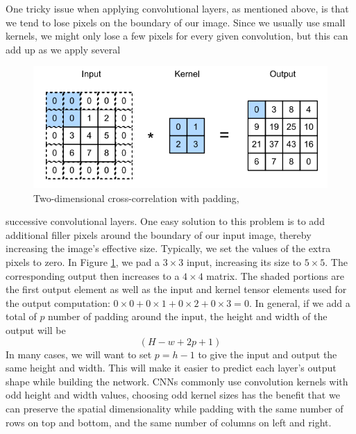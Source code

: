 \documentclass[12pt]{report}
\numberwithin{equation}{section}
\DeclarePairedDelimiter\ceil{\lceil}{\rceil}
\DeclarePairedDelimiter\floor{\lfloor}{\rfloor}
\begin{document}
One tricky issue when applying convolutional layers, as mentioned above, is that we tend to lose pixels on the boundary of our image. Since we usually use small kernels, we might only lose a few pixels for every given convolution, but this can add up as we apply several 
\begin{figure}[H]
\centering
\includegraphics[scale=0.9]{png/padding.png}
\caption[Two-dimensional cross-correlation with padding]{Two-dimensional cross-correlation with padding, \textbf{\cite{zhang2020dive}}}
\label{fig:pad}
\end{figure} \noindent
successive convolutional layers. One easy solution to this problem is to add additional filler pixels around the boundary of our input image, thereby increasing the image's effective size. Typically, we set the values of the extra pixels to zero. In Figure \ref{fig:pad}, we pad a $3 \times 3$ input, increasing its size to $5 \times 5$. The corresponding output then increases to a $4 \times 4$ matrix. The shaded portions are the first output element as well as the input and kernel tensor elements used for the output computation: $0 \times 0 + 0 \times 1 + 0 \times 2 + 0 \times 3 = 0$. In general, if we add a total of $p$ number of padding around the input, the height and width of the output will be
\begin{equation} \label{eqn:pad}
\left(H - w + 2p + 1\right)
\end{equation} \noindent
In many cases, we will want to set $p = h - 1$ to give the input and output the same height and width. This will make it easier to predict each layer's output shape while building the network. 
CNNs commonly use convolution kernels with odd height and width values, choosing odd kernel sizes has the benefit that we can preserve the spatial dimensionality while padding with the same number of rows on top and bottom, and the same number of columns on left and right.
\end{document}

